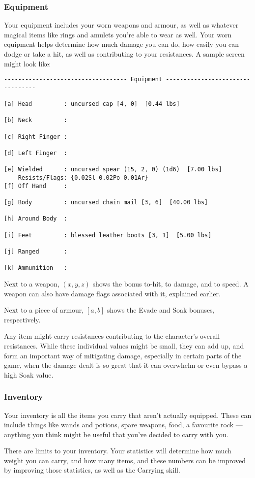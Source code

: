 \subsubsection{Equipment}

Your equipment includes your worn weapons and armour, as well as whatever
magical items like rings and amulets you're able to wear as well.  Your
worn equipment helps determine how much damage you can do, how easily you can
dodge or take a hit, as well as contributing to your resistances.  A sample
screen might look like:

\begin{verbatim}
----------------------------------- Equipment ---------------------------------

[a] Head         : uncursed cap [4, 0]  [0.44 lbs]

[b] Neck         :

[c] Right Finger :

[d] Left Finger  :

[e] Wielded      : uncursed spear (15, 2, 0) (1d6)  [7.00 lbs] 
    Resists/Flags: {0.02Sl 0.02Po 0.01Ar}
[f] Off Hand     :

[g] Body         : uncursed chain mail [3, 6]  [40.00 lbs]

[h] Around Body  :

[i] Feet         : blessed leather boots [3, 1]  [5.00 lbs]

[j] Ranged       :

[k] Ammunition   :

\end{verbatim}

Next to a weapon, \((x, y, z)\) shows the bonus to-hit, to damage, and to speed.
A weapon can also have damage flags associated with it, explained earlier.

Next to a piece of armour, \([a, b]\) shows the Evade and Soak bonuses,
respectively.

Any item might carry resistances contributing to the character's overall
resistances.  While these individual values might be small, they can add up,
and form an important way of mitigating damage, especially in certain parts
of the game, when the damage dealt is so great that it can overwhelm or even
bypass a high Soak value.

\subsubsection{Inventory}

Your inventory is all the items you carry that aren't actually equipped.
These can include things like wands and potions, spare weapons, food, a
favourite rock --- anything you think might be useful that you've decided
to carry with you.  

There are limits to your inventory. Your statistics will determine how much
weight you can carry, and how many items, and these numbers can be improved
by improving those statistics, as well as the Carrying skill.

